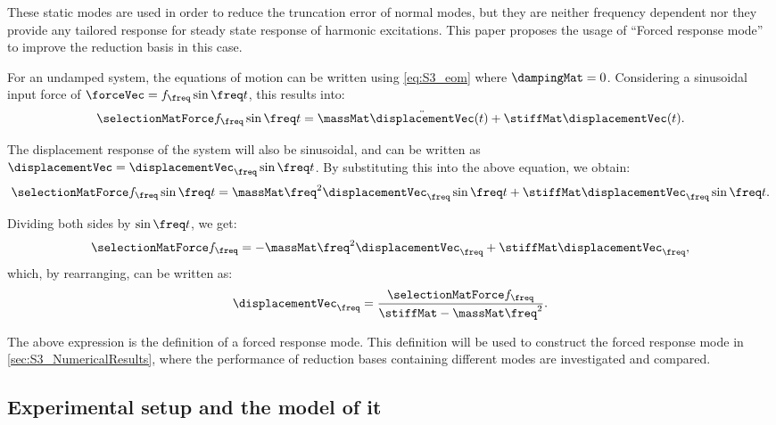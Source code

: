 These static modes are used in order to reduce the truncation error of normal modes, but they are neither frequency dependent nor they provide any tailored response for steady state response of harmonic excitations. This paper proposes the usage of “Forced response mode” to improve the reduction basis in this case.

For an undamped system, the equations of motion can be written using \cref{eq:S3_eom} where \(\dampingMat = 0\). Considering a sinusoidal input force of \( \forceVec = f_\freq \sin{\freq t} \), this results into:
\begin{align}
    \selectionMatForce f_\freq \sin{\freq t} = \massMat \ddot{\displacementVec}(t)  + \stiffMat \displacementVec (t).
\end{align}

The displacement response of the system will also be sinusoidal, and can be written as \(\displacementVec = \displacementVec_\freq \sin{\freq t}\). By substituting this into the above equation, we obtain:
\begin{align}
    \selectionMatForce f_\freq \sin{\freq t} = \massMat \freq^2  \displacementVec_\freq \sin{\freq t}  + \stiffMat \displacementVec_\freq \sin{\freq t}.
\end{align}

Dividing both sides by $\sin{\freq t}$, we get:
\begin{align}
    \selectionMatForce f_\freq = -\massMat \freq^2 \displacementVec_\freq + \stiffMat \displacementVec_\freq,
\end{align}
which, by rearranging, can be written as:
\begin{align}
    \displacementVec_\freq =  \frac{\selectionMatForce f_\freq}{\stiffMat - \massMat \freq^2} .
\end{align}

The above expression is the definition of a forced response mode. This definition will be used to construct the forced response mode in \cref{sec:S3_NumericalResults}, where the performance of reduction bases containing different modes are investigated and compared.


\subsection{Experimental setup and the model of it}
\label{sec:S3_ExperimentalSetupAndModel}

